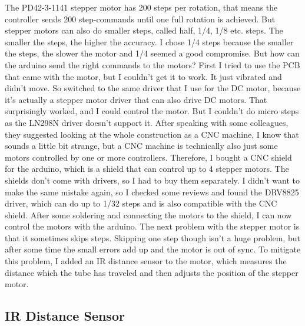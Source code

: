 The PD42-3-1141 stepper motor has 200 steps per rotation, that means the controller sends 200 step-commands until one full rotation is achieved.
But stepper motors can also do smaller steps, called half, 1/4, 1/8 etc. steps.
The smaller the steps, the higher the accuracy.
I chose 1/4 steps because the smaller the steps, the slower the motor and 1/4 seemed a good compromise.
But how can the arduino send the right commands to the motors?
First I tried to use the PCB that came with the motor, but I couldn't get it to work.
It just vibrated and didn't move.
So switched to the same driver that I use for the DC motor, because it's actually a stepper motor driver that can also drive DC motors.
That surprisingly worked, and I could control the motor.
But I couldn't do micro steps as the LN298N driver doesn't support it.
After speaking with some colleagues, they suggested looking at the whole construction as a CNC machine, I know that sounds a little bit strange, but a CNC machine is technically also just some motors controlled by one or more controllers.
Therefore, I bought a CNC shield for the arduino, which is a shield that can control up to 4 stepper motors.
The shields don't come with drivers, so I had to buy them separately.
I didn't want to make the same mistake again, so I checked some reviews and found the DRV8825\autocite{drv8825} driver, which can do up to 1/32 steps and is also compatible with the CNC shield.
After some soldering and connecting the motors to the shield, I can now control the motors with the arduino.
The next problem with the stepper motor is that it sometimes skips steps.
Skipping one step though isn't a huge problem, but after some time the small errors add up and the motor is out of sync.
To mitigate this problem, I added an IR distance sensor to the motor, which measures the distance which the tube has traveled and then adjusts the position of the stepper motor.

\subsection{IR Distance Sensor}\label{subsec:ir-distance-sensor}

